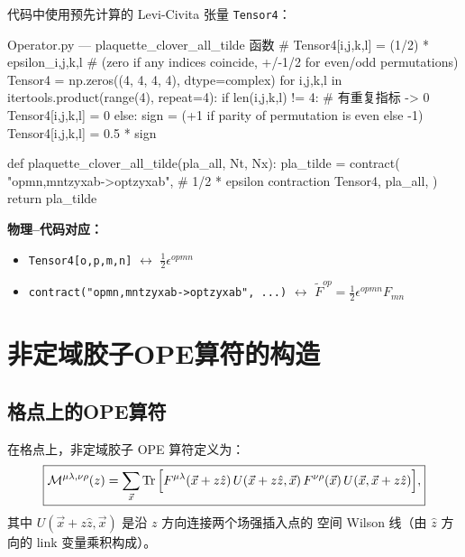 \documentclass[12pt,a4paper]{ctexart}
\begin{document}
代码中使用预先计算的 Levi-Civita 张量 \texttt{Tensor4}：
\begin{codeblock}{Operator.py --- plaquette\_clover\_all\_tilde 函数}
# Tensor4[i,j,k,l] = (1/2) * epsilon_{i,j,k,l}
# (zero if any indices coincide, +/-1/2 for even/odd permutations)
Tensor4 = np.zeros((4, 4, 4, 4), dtype=complex)
for i,j,k,l in itertools.product(range(4), repeat=4):
    if len({i,j,k,l}) != 4:  # 有重复指标 -> 0
        Tensor4[i,j,k,l] = 0
    else:
        sign = (+1 if parity of permutation is even else -1)
        Tensor4[i,j,k,l] = 0.5 * sign

def plaquette_clover_all_tilde(pla_all, Nt, Nx):
    pla_tilde = contract(
        "opmn,mntzyxab->optzyxab",  # 1/2 * epsilon contraction
        Tensor4,
        pla_all,
    )
    return pla_tilde
\end{codeblock}

\textbf{物理--代码对应：}
\begin{itemize}
    \item \texttt{Tensor4[o,p,m,n]} $\longleftrightarrow$
        $\frac{1}{2} \epsilon^{opmn}$
    \item \texttt{contract("opmn,mntzyxab->optzyxab", ...)} $\longleftrightarrow$
        $\tilde{F}^{op} = \frac{1}{2} \epsilon^{opmn} F_{mn}$
\end{itemize}


\section{非定域胶子OPE算符的构造}\label{sec:ope}

\subsection{格点上的OPE算符}

在格点上，非定域胶子 OPE 算符定义为\cite{gluon_pdf_derivation}：
\begin{equation}\label{eq:ope_lattice}
\boxed{
\mathcal{M}^{\mu\lambda, \nu\rho}(z)
    = \sum_{\vec{x}} \Tr \Big[ F^{\mu\lambda}(\vec{x} + z\hat{z}) \,
        U(\vec{x} + z\hat{z}, \vec{x}) \,
        F^{\nu\rho}(\vec{x}) \,
        U(\vec{x}, \vec{x} + z\hat{z}) \Big],
}
\end{equation}
其中 $U(\vec{x} + z\hat{z}, \vec{x})$ 是沿 $z$ 方向连接两个场强插入点的
空间 Wilson 线（由 $\hat{z}$ 方向的 link 变量乘积构成）。
\end{document}

